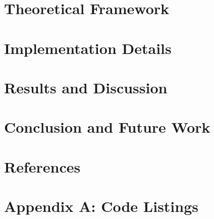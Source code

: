 \documentclass[12pt, a4paper, twoside]{report}
\begin{document}
\chapter{Theoretical Framework}
\lipsum[5]

\chapter{Implementation Details}
\lipsum[6]

\chapter{Results and Discussion}
\lipsum[7]

\chapter{Conclusion and Future Work}
\lipsum[8]

\chapter*{References}
\lipsum[9]

\appendix
\chapter{Appendix A: Code Listings}
\lipsum[10]
\end{document}
